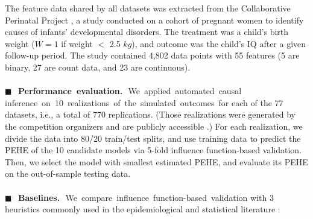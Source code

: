 \documentclass [PhD] {uclathes}
\begin{document}
The feature data shared by all datasets was extracted from the Collaborative Perinatal Project \cite{niswander1972collaborative}, a study conducted on a cohort of pregnant women to identify causes of infants' developmental disorders. The treatment was a child's birth weight (\mbox{\footnotesize $W = 1$} if weight \mbox{\footnotesize $<$} 2.5 \mbox{\footnotesize $kg$}), and outcome was the child's IQ after a given follow-up period. The study contained 4,802 data points with 55 features (5 are binary, 27 are count data, and 23 are continuous).\\
\\
{\bf \mbox{\tiny $\blacksquare$}\,~Performance~evaluation.}\,~We~applied~automated~causal inference~on~10~realizations~of~the~simulated~outcomes~for each of the 77 datasets, i.e., a total of 770 replications. (Those realizations were generated by the competition organizers and are publicly accessible \cite{HillACIC}.) For each realization, we divide the data into 80/20 train/test splits, and use training data to predict the PEHE of the 10 candidate models via 5-fold influence function-based validation. Then, we select the model with smallest estimated PEHE, and evaluate its PEHE on the out-of-sample testing data.\\ 
\\
{\bf \mbox{\tiny $\blacksquare$}\,~Baselines.}\,~We~compare~influence~function-based~validation with 3 heuristics commonly used in the epidemiological and statistical literature \cite{schuler2018general}:
\end{document}

